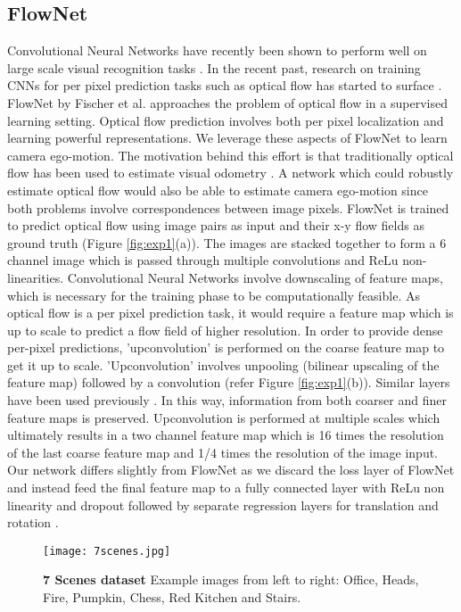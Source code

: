\documentclass[usletter, 10 pt, conference]{ieeeconf}  %
\begin{document}
\subsection{FlowNet}
Convolutional Neural Networks have recently been shown to perform well on large scale visual recognition tasks \cite{krizhevsky2012imagenet}. In the recent past, research on training CNNs for per pixel prediction tasks such as optical flow has started to surface \cite{dosovitskiy2015flownet}. FlowNet by Fischer et al. \cite{dosovitskiy2015flownet} approaches the problem of optical flow in a supervised learning setting. Optical flow prediction involves both per pixel localization and learning powerful representations. We leverage these aspects of FlowNet to learn camera ego-motion. The motivation behind this effort is that traditionally optical flow has been used to estimate visual odometry \cite{campbell2004techniques}. A network which could robustly estimate optical flow would also be able to estimate camera ego-motion since both problems involve correspondences between image pixels. FlowNet is trained to predict optical flow using image pairs as input and their x-y flow fields as ground truth (Figure \ref{fig:exp1}(a)). The images are stacked together to form a 6 channel image which is passed through multiple convolutions and ReLu non-linearities. Convolutional Neural Networks involve downscaling of feature maps, which is necessary for the training phase to be computationally feasible. As optical flow is a per pixel prediction task, it would require a feature map which is up to scale to predict a flow field of higher resolution. In order to provide dense per-pixel predictions, 'upconvolution' is performed on the coarse feature map to get it up to scale. 'Upconvolution' involves unpooling (bilinear upscaling of the feature map) followed by a convolution (refer Figure \ref{fig:exp1}(b)). Similar layers have been used previously \cite{dosovitskiy2015learning}. In this way, information from both coarser and finer feature maps is preserved. Upconvolution is performed at multiple scales which ultimately results in a two channel feature map which is 16 times the resolution of the last coarse feature map and 1/4 times the resolution of the image input. 
Our network differs slightly from FlowNet as we discard the loss layer of FlowNet and instead feed the final feature map to a fully connected layer with ReLu non linearity and dropout followed by separate regression layers for translation and rotation \cite{kendall2015posenet}.
  

\begin{figure*}[t!]
\begin{center}
\texttt{[image: 7scenes.jpg]} \\
\caption{\textbf{7 Scenes dataset}
Example images from left to right: Office, Heads, Fire, Pumpkin, Chess, Red Kitchen and Stairs.}
\label{fig:sevensceneds1}
\end{center}
\vspace{-0.3cm}
\end{figure*}
\end{document}
